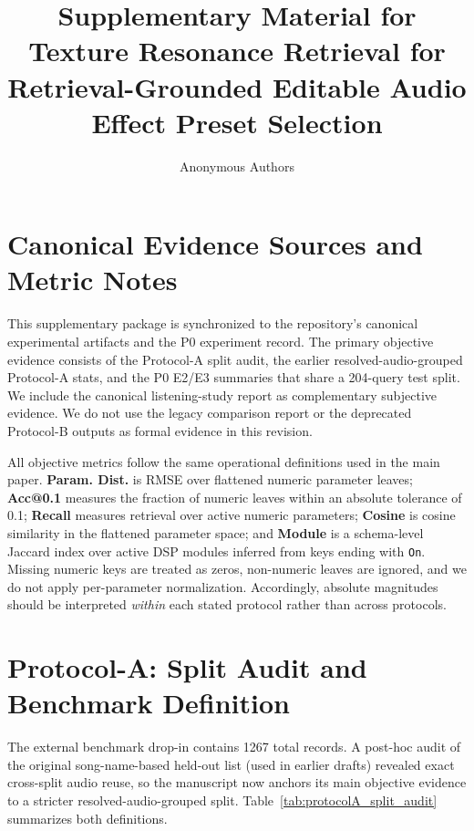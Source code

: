 \documentclass{article}
\title{Supplementary Material for Texture Resonance Retrieval for Retrieval-Grounded Editable Audio Effect Preset Selection}
\author{Anonymous Authors}
\date{}
\begin{document}
\maketitle

\renewcommand{\thesection}{S\arabic{section}}
\renewcommand{\thetable}{S\arabic{table}}
\renewcommand{\thefigure}{S\arabic{figure}}
\setcounter{section}{0}
\setcounter{table}{0}
\setcounter{figure}{0}

\section{Canonical Evidence Sources and Metric Notes}

This supplementary package is synchronized to the repository's canonical experimental artifacts and the P0 experiment record. The primary objective evidence consists of the Protocol-A split audit, the earlier resolved-audio-grouped Protocol-A stats, and the P0 E2/E3 summaries that share a 204-query test split. We include the canonical listening-study report as complementary subjective evidence. We do not use the legacy comparison report or the deprecated Protocol-B outputs as formal evidence in this revision.

All objective metrics follow the same operational definitions used in the main paper. \textbf{Param. Dist.} is RMSE over flattened numeric parameter leaves; \textbf{Acc@0.1} measures the fraction of numeric leaves within an absolute tolerance of 0.1; \textbf{Recall} measures retrieval over active numeric parameters; \textbf{Cosine} is cosine similarity in the flattened parameter space; and \textbf{Module} is a schema-level Jaccard index over active DSP modules inferred from keys ending with \texttt{On}. Missing numeric keys are treated as zeros, non-numeric leaves are ignored, and we do not apply per-parameter normalization. Accordingly, absolute magnitudes should be interpreted \emph{within} each stated protocol rather than across protocols.

\section{Protocol-A: Split Audit and Benchmark Definition}

The external benchmark drop-in contains 1267 total records. A post-hoc audit of the original song-name-based held-out list (used in earlier drafts) revealed exact cross-split audio reuse, so the manuscript now anchors its main objective evidence to a stricter resolved-audio-grouped split. Table~\ref{tab:protocolA_split_audit} summarizes both definitions.
\end{document}
